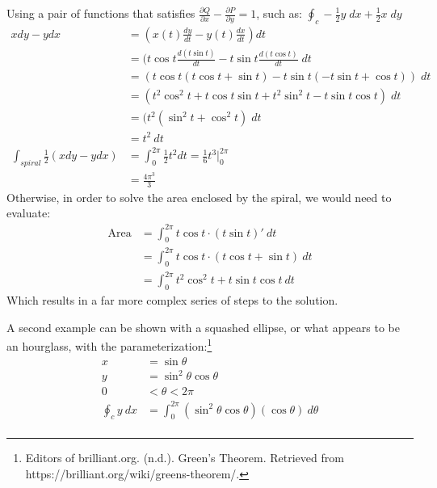 \documentclass[11pt,English]{article}
\begin{document}
Using a pair of functions that satisfies $\frac{\partial Q}{\partial x} - \frac{\partial P}{\partial y} = 1$, such as: $\oint_{c}-\frac{1}{2}y \; dx+\frac{1}{2}x \; dy $
\begin{align*}
    xdy-ydx &= (x(t)\frac{dy}{dt}-y(t)\frac{dx}{dt})dt \\
    &= (t\cos{t}\frac{d(t\sin{t})}{dt}-t\sin{t}\frac{d(t\cos{t})}{dt}\;dt \\
    &= (t\cos{t}(t\cos{t}+\sin{t})-t\sin{t}(-t\sin{t}+\cos{t}))\;dt \\
    &= (t^2\cos^2{t}+t\cos{t}\sin{t}+t^2\sin^2{t}-t\sin{t}\cos{t})\;dt\\
    &= (t^2(\sin^2{t}+\cos^2{t})\;dt \\
    &= t^2\:dt \\
    \int_{spiral}\frac{1}{2}(xdy-ydx) &= \int^{2\pi}_{0}\frac{1}{2}t^2dt = \frac{1}{6}t^3\Big|^{2\pi}_{0} \\
    &= \frac{4\pi^3}{3}
\end{align*}
Otherwise, in order to solve the area enclosed by the spiral, we would need to evaluate:
\begin{align*}
    \text{Area} &= \int^{2\pi}_{0} t\cos{t}\cdot (t\sin{t})'\:dt \\
    &= \int^{2\pi}_{0}t\cos{t}\cdot (t\cos{t}+\sin{t})\:dt \\
    &= \int^{2\pi}_{0} t^{2}\cos^{2}{t}+t\sin{t}\cos{t}\:dt
\end{align*}
Which results in a far more complex series of steps to the solution.

A second example can be shown with a squashed ellipse, or what appears to be an hourglass, with the parameterization:\footnote{Editors of brilliant.org. (n.d.). Green's Theorem. Retrieved from https://brilliant.org/wiki/greens-theorem/.}
\begin{align*}
    x &= \sin{\theta} \\
    y &= \sin^2{\theta}\cos{\theta} \\
    0 &< \theta < 2\pi \\
    \oint_{c}y\:dx &= \int^{2\pi}_{0}(\sin^2{\theta}\cos{\theta})(\cos{\theta})\:d\theta \\
\end{align*}
\end{document}
